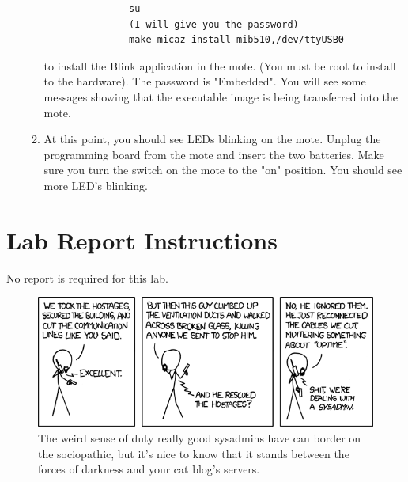 \documentclass[letterpaper,12pt]{article}
\begin{document}
\begin{enumerate}
\begin{enumerate}
               \begin{lstlisting}
               su
               (I will give you the password)
               make micaz install mib510,/dev/ttyUSB0
               \end{lstlisting}
               to install the Blink application in the mote. (You must be root to install to the hardware). The password is "Embedded". You will see some messages showing that the executable image
               is being transferred into the mote.
         \item At this point, you should see LEDs blinking on the mote. Unplug the programming board
               from the mote and insert the two batteries. Make sure you turn the switch on the mote to the
               "on" position. You should see more LED's blinking.
      \end{enumerate}
\end{enumerate}

\section*{Lab Report Instructions}
No report is required for this lab.

\begin{figure}[ht!]
	\centering
	\includegraphics[width=5in]{devotion_to_duty.png}
	\caption*{The weird sense of duty really good sysadmins have can border on the sociopathic, 
		but it's nice to know that it stands between the forces of darkness and your cat blog's servers.}
\end{figure}
\end{document}
